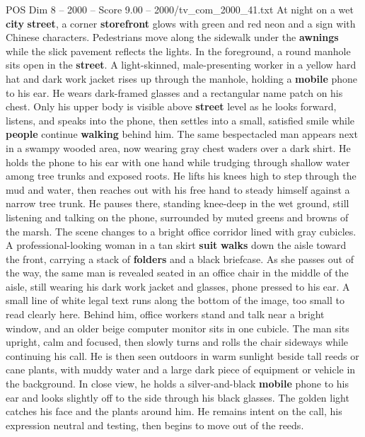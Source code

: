 \begin{textsample}{POS Dim 8 – 2000 – Score 9.00 – 2000/tv\_com\_2000\_41.txt}  \label{ex:f8_pos_007}
At night on a wet \textbf{city} \textbf{street}, a corner \textbf{storefront} glows with green and red neon and a sign with Chinese characters.
Pedestrians move along the sidewalk under the \textbf{awnings} while the slick pavement reflects the lights.
In the foreground, a round manhole sits open in the \textbf{street}.
A light-skinned, male-presenting worker in a yellow hard hat and dark work jacket rises up through the manhole, holding a \textbf{mobile} phone to his ear.
He wears dark-framed glasses and a rectangular name patch on his chest.
Only his upper body is visible above \textbf{street} level as he looks forward, listens, and speaks into the phone, then settles into a small, satisfied smile while \textbf{people} continue \textbf{walking} behind him.
The same bespectacled man appears next in a swampy wooded area, now wearing gray chest waders over a dark shirt.
He holds the phone to his ear with one hand while trudging through shallow water among tree trunks and exposed roots.
He lifts his knees high to step through the mud and water, then reaches out with his free hand to steady himself against a narrow tree trunk.
He pauses there, standing knee-deep in the wet ground, still listening and talking on the phone, surrounded by muted greens and browns of the marsh.
The scene changes to a bright office corridor lined with gray cubicles.
A professional-looking woman in a tan skirt \textbf{suit} \textbf{walks} down the aisle toward the front, carrying a stack of \textbf{folders} and a black briefcase.
As she passes out of the way, the same man is revealed seated in an office chair in the middle of the aisle, still wearing his dark work jacket and glasses, phone pressed to his ear.
A small line of white legal text runs along the bottom of the image, too small to read clearly here.
Behind him, office workers stand and talk near a bright window, and an older beige computer monitor sits in one cubicle.
The man sits upright, calm and focused, then slowly turns and rolls the chair sideways while continuing his call.
He is then seen outdoors in warm sunlight beside tall reeds or cane plants, with muddy water and a large dark piece of equipment or vehicle in the background.
In close view, he holds a silver-and-black \textbf{mobile} phone to his ear and looks slightly off to the side through his black glasses.
The golden light catches his face and the plants around him.
He remains intent on the call, his expression neutral and testing, then begins to move out of the reeds.

\end{textsample}
